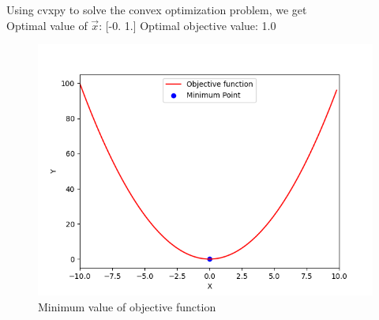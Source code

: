 \documentclass[journal]{IEEEtran}
\begin{document}
Using cvxpy to solve the convex optimization problem, we get\\
Optimal value of $\vec{x}$: [-0.  1.]
Optimal objective value: 1.0
\begin{figure}[h!]
   \centering
   \includegraphics[width=0.7\columnwidth]{figs/fig.png}
    \caption{Minimum value of objective function}
\end{figure}
\end{document}

